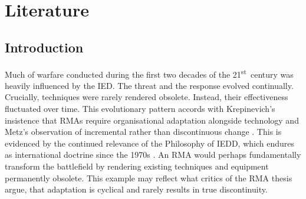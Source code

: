 \chapter{Literature}



\section{Introduction}Much of warfare conducted during the first two decades of the 21\textsuperscript{st}~century was heavily influenced by the IED. The threat and the response evolved continually. Crucially, techniques were rarely rendered obsolete. Instead, their effectiveness fluctuated over time. This evolutionary pattern accords with Krepinevich’s insistence that RMAs require organisational adaptation alongside technology \parencite{KREPINEVICH_1992} and Metz’s observation of incremental rather than discontinuous change \parencite{METZ_2000,KREPINEVICH_1994}. This is evidenced by the continued relevance of the Philosophy of IEDD, which endures as international doctrine since the 1970s  \parencite{COCHRANE_2012,DORD_2022}. An RMA would perhaps fundamentally transform the battlefield by rendering existing techniques and equipment permanently obsolete. This example may reflect what critics of the RMA thesis argue, that adaptation is cyclical and rarely results in true discontinuity. %

 

